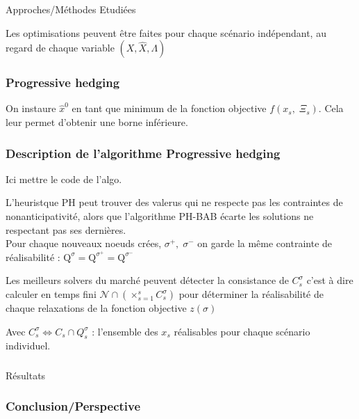 \documentclass[10pt]{beamer}
\begin{document}
\begin{section}{Approches/Méthodes Etudiées}
    \begin{frame}
        Les optimisations peuvent être faites pour chaque scénario indépendant, au regard de chaque variable $(X, \hat{X}, \Lambda)$
    \end{frame}
    
    
    
    \begin{frame}
        \frametitle{Progressive hedging}
        On instaure $\hat{x}^0$ en tant que minimum de la fonction objective $f(x_s, \; \Xi_s)$. Cela leur permet d'obtenir une borne inférieure.
        
    \end{frame}
    
    \begin{frame}
        \frametitle{Description de l'algorithme Progressive hedging}
         Ici mettre le code de l'algo.
        
        
    \end{frame}
    
    \begin{frame}
       L'heuristque PH peut trouver des valerus qui ne respecte pas les contraintes de nonanticipativité, alors que l'algorithme PH-BAB écarte les solutions ne respectant pas ses dernières.\\
       Pour chaque nouveaux noeuds crées, $\sigma^+,\;\sigma^-$ on garde la même contrainte de réalisabilité : $\mathrm{Q}^\sigma = \mathrm{Q}^{\sigma^+} = \mathrm{Q}^{\sigma^-}$
    \end{frame}
    
    \begin{frame}
      Les meilleurs solvers du marché peuvent détecter la consistance de $C_s^\sigma$ c'est à dire calculer en temps fini 
      $\mathcal{N}\cap(\times_{s = 1}^s C_s^\sigma)$ pour déterminer la réalisabilité de chaque relaxations de la fonction objective $z(\sigma)$
      
      Avec $C_s^\sigma \Leftrightarrow C_s \cap Q_s^\sigma$ : l'ensemble des $x_s$ réalisables pour chaque scénario individuel.
    \end{frame}
    \end{section}
    
    
    \begin{frame}
        \frametitle{}            
    \end{frame}
        
    \begin{section}{Résultats}
    \begin{frame}
    
    \end{frame}
    \end{section}
    
    
    \begin{frame}
        \frametitle{Conclusion/Perspective}
    \end{frame}
    
    \iffalse
    \fi
\end{document}
